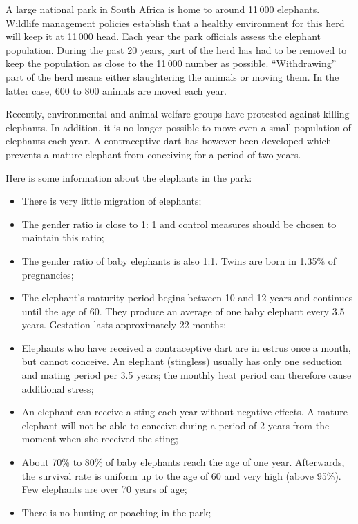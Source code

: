 A large national park in South Africa is home to around 11\,000 elephants. 
Wildlife management policies establish that a healthy environment for this herd will keep it at 11\,000 head. 
Each year the park officials assess the elephant population. 
During the past 20 years, part of the herd has had to be removed to keep the population as close to the 11\,000 number as possible. 
``Withdrawing'' part of the herd means either slaughtering the animals or moving them. 
In the latter case, 600 to 800 animals are moved each year.

Recently, environmental and animal welfare groups have protested against killing elephants. 
In addition, it is no longer possible to move even a small population of elephants each year. 
A contraceptive dart has however been developed which prevents a mature elephant from conceiving for a period of two years.

Here is some information about the elephants in the park:
\begin{emphbox}[]
\begin{itemize}
	\item There is very little migration of elephants;
	\item The gender ratio is close to 1: 1 and control measures should be chosen to maintain this ratio;
	\item The gender ratio of baby elephants is also 1:1. Twins are born in 1.35\% of pregnancies;
	\item The elephant's maturity period begins between 10 and 12 years and continues until the age of 60. They produce an average of one baby elephant every 3.5 years. Gestation lasts approximately 22 months;
	\item Elephants who have received a contraceptive dart are in estrus once a month, but cannot conceive. An elephant (stingless) usually has only one seduction and mating period per 3.5 years; the monthly heat period can therefore cause additional stress;
	\item An elephant can receive a sting each year without negative effects. A mature elephant will not be able to conceive during a period of 2 years from the moment when she received the sting;
	\item About 70\% to 80\% of baby elephants reach the age of one year. Afterwards, the survival rate is uniform up to the age of 60 and very high (above 95\%). Few elephants are over 70 years of age;
	\item There is no hunting or poaching in the park;
\end{itemize}
\end{emphbox}

